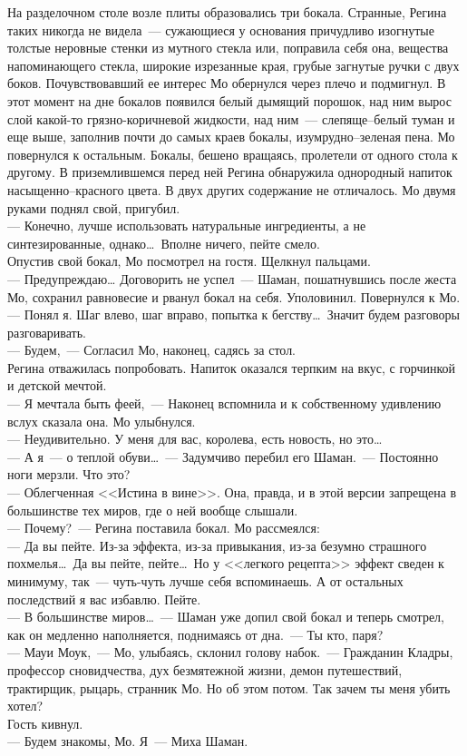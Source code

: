 На разделочном столе возле плиты образовались три бокала. Странные, Регина 
таких никогда не видела~--- сужающиеся у основания причудливо изогнутые толстые 
неровные стенки из мутного стекла или, поправила себя она, вещества напоминающего 
стекла, широкие изрезанные края, грубые загнутые ручки с двух боков. Почувствовавший ее 
интерес Мо обернулся через плечо и подмигнул. В этот момент на дне бокалов 
появился белый дымящий порошок, над ним вырос слой какой-то грязно-коричневой 
жидкости, над ним~--- слепяще--белый туман и еще выше, заполнив почти до самых 
краев бокалы, изумрудно--зеленая пена. Мо повернулся к остальным. Бокалы, бешено 
вращаясь, пролетели от одного стола к другому. В приземлившемся перед ней 
Регина обнаружила однородный напиток насыщенно--красного цвета. В двух других 
содержание не отличалось. Мо двумя руками поднял свой, пригубил.\\
--- Конечно, лучше использовать натуральные ингредиенты, а не синтезированные, 
однако\ldots\ Вполне ничего, пейте смело.\\
Опустив свой бокал, Мо посмотрел на гостя. Щелкнул пальцами.\\
--- Предупреждаю\ldots
Договорить не успел~--- Шаман, пошатнувшись после жеста Мо, сохранил равновесие 
и рванул бокал на себя. Уполовинил. Повернулся к Мо.\\
--- Понял я. Шаг влево, шаг вправо, попытка к бегству\ldots\ Значит будем 
разговоры разговаривать.\\
--- Будем,~--- Согласил Мо, наконец, садясь за стол.\\
Регина отважилась попробовать. Напиток оказался терпким на вкус, с горчинкой и 
детской мечтой.\\
--- Я мечтала быть феей,~--- Наконец вспомнила и к собственному удивлению вслух 
сказала она. Мо улыбнулся.\\
--- Неудивительно. У меня для вас, королева, есть новость, но это\ldots\\
--- А я~--- о теплой обуви\ldots~--- Задумчиво перебил его Шаман.~--- Постоянно 
ноги мерзли. Что это?\\
--- Облегченная <<Истина в вине>>. Она, правда, и в этой версии запрещена в 
большинстве тех миров, где о ней вообще слышали.\\
--- Почему?~--- Регина поставила бокал. Мо рассмеялся:\\
--- Да вы пейте. Из-за эффекта, из-за привыкания, из-за безумно страшного 
похмелья\ldots\ Да вы пейте, пейте\ldots\ Но у <<легкого рецепта>> эффект 
сведен к минимуму, так~--- чуть-чуть лучше себя вспоминаешь. А от остальных последствий я вас 
избавлю. Пейте.\\
--- В большинстве миров\ldots~--- Шаман уже допил свой бокал и теперь смотрел, 
как он медленно наполняется, поднимаясь от дна.~--- Ты кто, паря?\\
--- Мауи Моук,~--- Мо, улыбаясь, склонил голову набок.~--- Гражданин Кладры, 
профессор сновидчества, дух безмятежной жизни, демон путешествий, трактирщик, рыцарь, 
странник Мо. Но об этом потом. Так зачем ты меня убить хотел?\\
Гость кивнул.\\
--- Будем знакомы, Мо. Я~--- Миха Шаман.

